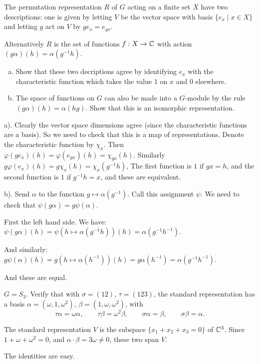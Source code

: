 \documentclass[11pt, english]{article}
\begin{document}
\begin{exc}[Exercise 1.4]
The permutation representation $R$ of $G$ acting on a finite set $X$ have two descriptions: one is given by letting $V$ be the vector space with basis $\{ e_x \mid x \in X \}$ and letting $g$ act on $V$ by $ge_x = e_{gx}$. 

Alternatively $R$ is the set of functions $f:X \to \mathbb{C}$ with action $(g\alpha)(h)=\alpha(g^{-1}h)$.

\begin{enumerate}[a)]
\item Show that these two decriptions agree by identifying $e_x$ with the characteristic function which takes the value $1$ on $x$ and $0$ elsewhere. 
\item The space of functions on $G$ can also be made into a $G$-module by the rule $(g\alpha)(h)=\alpha(hg)$. Show that this is an isomorphic representation.
\end{enumerate}
\end{exc}
\begin{sol}
a). Clearly the vector space dimensions agree (since the characteristic functions are a basis). So we need to check that this is a map of representations. Denote the characteristic function by $\chi_x$. Then $\varphi(ge_x)(h) = \varphi(e_{gx})(h)=\chi_{gx}(h)$. Similarly $g \varphi(e_x)(h) = g \chi_x(h) = \chi_x(g^{-1}h)$, The first function is $1$ if $gx=h$, and the second function is $1$ if $g^{-1}h=x$, and these are equivalent.

b). Send $\alpha$ to the function $g \mapsto \alpha(g^{-1})$. Call this assignment $\psi$. We need to check that $\psi(g\alpha)=g \psi(\alpha)$. 

First the left hand side. We have: $\psi(g\alpha)(h)=\psi(h \mapsto \alpha(g^{-1}h))(h)=\alpha(g^{-1}h^{-1})$.

And similarly: $g \psi(\alpha)(h)=g (h \mapsto \alpha(h^{-1}))(h) = g \alpha(h^{-1})=\alpha(g^{-1}h^{-1})$. 

And these are equal.
\end{sol}

\begin{exc}[Exercise 1.10]
$G=S_3$. Verify that with $\sigma=(12)$, $\tau=(123)$, the standard representation has a basis $\alpha=(\omega, 1, \omega^2)$, $\beta=(1,\omega,\omega^2)$, with
\[
\tau \alpha = \omega \alpha, \qquad \tau \beta = \omega^2 \beta, \qquad \sigma \alpha = \beta, \qquad \sigma \beta = \alpha.
\]
\end{exc}
\begin{sol}
The standard representation $V$ is the subspace $\{ x_1+x_2+x_3=0 \}$ of $\mathbb{C}^3$. Since $1+\omega+\omega^2=0$, and $\alpha \cdot \beta = 3\omega \neq 0$, these two span $V$.

The identities are easy.
\end{sol}
\end{document}
